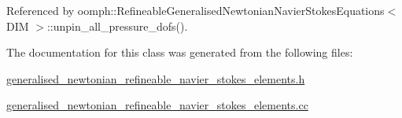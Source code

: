 Referenced by oomph\+::\+Refineable\+Generalised\+Newtonian\+Navier\+Stokes\+Equations$<$ D\+I\+M $>$\+::unpin\+\_\+all\+\_\+pressure\+\_\+dofs().



The documentation for this class was generated from the following files\+:\begin{DoxyCompactItemize}
\item 
\hyperlink{generalised__newtonian__refineable__navier__stokes__elements_8h}{generalised\+\_\+newtonian\+\_\+refineable\+\_\+navier\+\_\+stokes\+\_\+elements.\+h}\item 
\hyperlink{generalised__newtonian__refineable__navier__stokes__elements_8cc}{generalised\+\_\+newtonian\+\_\+refineable\+\_\+navier\+\_\+stokes\+\_\+elements.\+cc}\end{DoxyCompactItemize}
